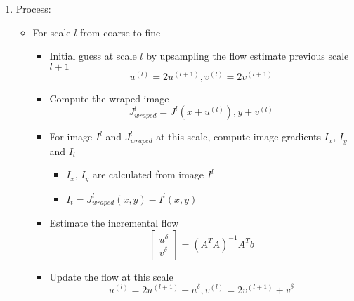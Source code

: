 \documentclass[9pt]{article}
\begin{document}
\begin{multicols*}{2}
\begin{enumerate}
        \item Process:
        \begin{itemize}
            \item For scale $l$ from coarse to fine 
            \begin{itemize}
                \item Initial guess at scale $l$ by upsampling the flow estimate
                previous scale $l+1$ 
                $$
                    u^{(l)} = 2u^{(l+1)}, v^{(l)} = 2v^{(l+1)}
                $$
                \item Compute the wraped image 
                $$
                    J_{wraped}^l = J^l (x + u^{(l)}), y + v^{(l)}
                $$

                \item For image $I^l$ and $J_{wraped}^l$ at this scale, compute
                image gradients $I_x$, $I_y$ and $I_t$
                \begin{itemize}
                    \item $I_x$, $I_y$ are calculated from image $I^l$
                    \item $I_t = J_{wraped}^l (x,y) - I^l(x,y)$
                \end{itemize}

                \item Estimate the incremental flow
                $$
                    \begin{bmatrix}
                        u^{\delta} \\ v^{\delta}
                    \end{bmatrix} = (A^T A)^{-1} A^T b
                $$

                \item Update the flow at this scale
                $$
                    u^{(l)} = 2u^{(l+1)} + u^\delta, v^{(l)} = 2v^{(l+1)} + v^{\delta}
                $$
            \end{itemize}
        \end{itemize}
    \end{enumerate}


\end{multicols*}
\end{document}
